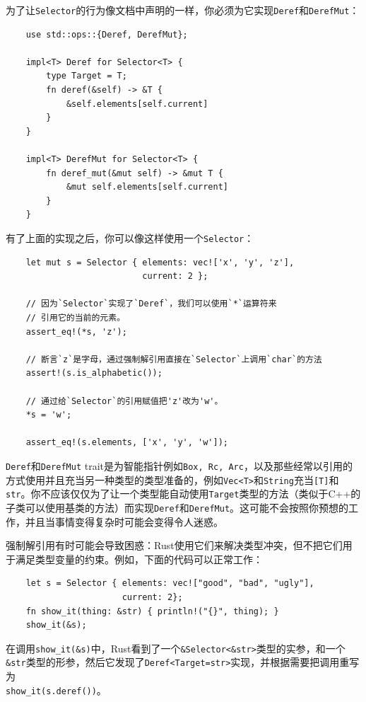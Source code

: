 为了让\texttt{Selector}的行为像文档中声明的一样，你必须为它实现\texttt{Deref}和\texttt{DerefMut}：
\begin{verbatim}
    use std::ops::{Deref, DerefMut};

    impl<T> Deref for Selector<T> {
        type Target = T;
        fn deref(&self) -> &T {
            &self.elements[self.current]
        }
    }

    impl<T> DerefMut for Selector<T> {
        fn deref_mut(&mut self) -> &mut T {
            &mut self.elements[self.current]
        }
    }
\end{verbatim}

有了上面的实现之后，你可以像这样使用一个\texttt{Selector}：
\begin{verbatim}
    let mut s = Selector { elements: vec!['x', 'y', 'z'],
                           current: 2 };

    // 因为`Selector`实现了`Deref`，我们可以使用`*`运算符来
    // 引用它的当前的元素。
    assert_eq!(*s, 'z');

    // 断言`z`是字母，通过强制解引用直接在`Selector`上调用`char`的方法
    assert!(s.is_alphabetic());

    // 通过给`Selector`的引用赋值把'z'改为'w'。
    *s = 'w';

    assert_eq!(s.elements, ['x', 'y', 'w']);
\end{verbatim}

\texttt{Deref}和\texttt{DerefMut} trait是为智能指针例如\texttt{Box, Rc, Arc}，以及那些经常以引用的方式使用并且充当另一种类型的类型准备的，例如\texttt{Vec<T>}和\texttt{String}充当\texttt{[T]}和\texttt{str}。你不应该仅仅为了让一个类型能自动使用\texttt{Target}类型的方法（类似于C++的子类可以使用基类的方法）而实现\texttt{Deref}和\texttt{DerefMut}。这可能不会按照你预想的工作，并且当事情变得复杂时可能会变得令人迷惑。

强制解引用有时可能会导致困惑：Rust使用它们来解决类型冲突，但不把它们用于满足类型变量的约束。例如，下面的代码可以正常工作：
\begin{verbatim}
    let s = Selector { elements: vec!["good", "bad", "ugly"],
                       current: 2};
    fn show_it(thing: &str) { println!("{}", thing); }
    show_it(&s);
\end{verbatim}

在调用\texttt{show\_it(\&s)}中，Rust看到了一个\texttt{\&Selector<\&str>}类型的实参，和一个\texttt{\&str}类型的形参，然后它发现了\texttt{Deref<Target=str>}实现，并根据需要把调用重写为\\
\texttt{show\_it(s.deref())}。

